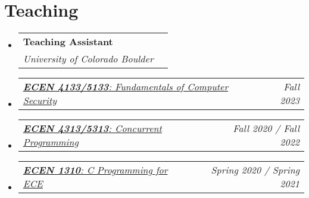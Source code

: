 \documentclass[letterpaper,11pt]{article}
\makeatletter
\newcommand{\resumeSubheading}[4]{
  \vspace{-2pt}\item
    \begin{tabular*}{0.97\textwidth}[t]{l@{\extracolsep{\fill}}r}
      \textbf{#1} & #2 \\
      \textit{\small#3} & \textit{\small #4} \\
    \end{tabular*}\vspace{-7pt}
}
\newcommand{\resumeSubSubheading}[2]{
    \item
    \begin{tabular*}{0.97\textwidth}{l@{\extracolsep{\fill}}r}
      \textit{\small#1} & \textit{\small #2} \\
    \end{tabular*}\vspace{-7pt}
}
\newcommand{\resumeSubHeadingListStart}{\begin{itemize}[leftmargin=0.15in, label={}]}
\newcommand{\resumeSubHeadingListEnd}{\end{itemize}}
\makeatother
\begin{document}
\section{Teaching}
\resumeSubHeadingListStart
\resumeSubheading
{Teaching Assistant}{}
{University of Colorado Boulder}{}
\resumeSubSubheading
{
  \em\href{https://experts.colorado.edu/display/coursename_ECEN-5133}{\textbf{ECEN 4133/5133}: Fundamentals of Computer Security}
}{Fall 2023}
\resumeSubSubheading
{
  \em\href{https://experts.colorado.edu/display/coursename_ECEN-5313}{\textbf{ECEN 4313/5313}: Concurrent Programming}
}{Fall 2020 / Fall 2022}
\resumeSubSubheading
{
  \em\href{https://experts.colorado.edu/display/coursename_ECEN-1310}{\textbf{ECEN 1310}: C Programming for ECE}
}{Spring 2020 / Spring 2021}
\resumeSubHeadingListEnd
\vspace{1pt}
\end{document}
